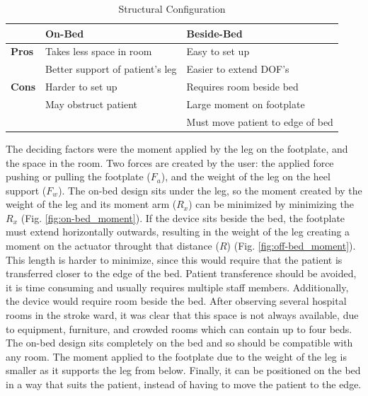 \documentclass[12pt]{report}
\begin{document}
		
	\begin{table}[] \label{tab:config}
	\centering
	\caption{Structural Configuration }	
	\begin{tabular}{l|l|l}
		\hline
		& \textbf{On-Bed} & \textbf{Beside-Bed}  \\ \hline
		\textbf{Pros} & Takes less space in room  & Easy to set up  \\ 
		 & Better support of patient's leg  & Easier to extend DOF's \\ \hline
		 \textbf{Cons} & Harder to set up  & Requires room beside bed \\ 
		 & May obstruct patient  & Large moment on footplate \\ 
		 & & Must move patient to edge of bed \\ \hline

		\end{tabular}
	\label{tab:structure}
	\end{table}
		


	The deciding factors were the moment applied by the leg on the footplate, and the space in the room. Two forces are created by the user: the applied force pushing or pulling the footplate ($F_a$), and the weight of the leg on the heel support ($F_w$). The on-bed design sits under the leg, so the moment created by the weight of the leg and its moment arm ($R_x$) can be minimized by minimizing the $R_x$ (Fig. \ref{fig:on-bed_moment}). If the device sits beside the bed, the footplate must extend horizontally outwards, resulting in the weight of the leg creating a moment on the actuator throught that distance ($R$) (Fig. \ref{fig:off-bed_moment}). This length is harder to minimize, since this would require that the patient is transferred closer to the edge of the bed. Patient transference should be avoided, it is time consuming and usually requires multiple staff members. Additionally, the device would require room beside the bed. After observing several hospital rooms in the stroke ward, it was clear that this space is not always available, due to equipment, furniture, and crowded rooms which can contain up to four beds. The on-bed design sits completely on the bed and so should be compatible with any room. The moment applied to the footplate due to the weight of the leg is smaller as it supports the leg from below. Finally, it can be positioned on the bed in a way that suits the patient, instead of having to move the patient to the edge. 
	
\end{document}
